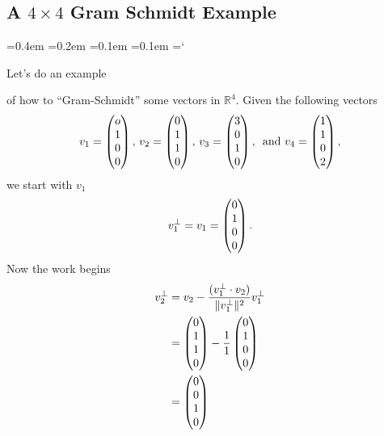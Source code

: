 \subsection*{A $4\times4$ Gram Schmidt Example}

{\ttfamily
{}\font=0.4em
\font=0.2em
\font=0.1em
\font=0.1em
\hyphenchar\font=`\-


\hypertarget{scripts_gram_schmidt_and_orthogonal_complements_4by4_example}{Let's do an example} of how to ``Gram-Schmidt'' some vectors in $\mathbb{R}^4$. Given the following vectors
\[
v_1 = \begin{pmatrix} o\\1 \\ 0\\ 0 \end{pmatrix}, \, v_2 = \begin{pmatrix} 0\\1\\ 1\\ 0 \end{pmatrix}, \, v_3 = \begin{pmatrix} 3\\0 \\ 1\\ 0 \end{pmatrix}, \, \text{ and } v_4 = \begin{pmatrix} 1\\ 1\\ 0\\2 \end{pmatrix},
\]
we start with $v_1$
\[
v_1^\bot = v_1 =\begin{pmatrix} 0\\1 \\ 0\\ 0 \end{pmatrix}.
\]
Now the work begins
\begin{align*}
v_2^\bot &= v_2 -\frac{(v_1^\bot \cdot v_2) }{\|v_1^\bot\|^2} v_1^\bot \\
&=\begin{pmatrix} 0\\1\\ 1\\ 0 \end{pmatrix} - \frac{1}{1}  \begin{pmatrix} 0\\1 \\ 0\\ 0 \end{pmatrix}\\
&=  \begin{pmatrix} 0\\0\\ 1\\ 0 \end{pmatrix}  \\
\end{align*}


}
